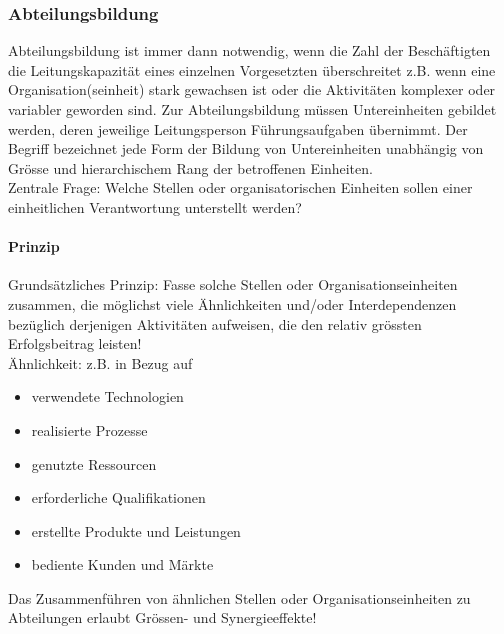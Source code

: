 \subsubsection{Abteilungsbildung}
Abteilungsbildung ist immer dann notwendig, wenn die Zahl der Beschäftigten die Leitungskapazität eines einzelnen Vorgesetzten überschreitet z.B. wenn eine Organisation(seinheit) stark gewachsen ist oder die Aktivitäten komplexer oder variabler geworden sind. Zur Abteilungsbildung müssen Untereinheiten gebildet werden, deren jeweilige Leitungsperson Führungsaufgaben übernimmt. Der Begriff bezeichnet jede Form der Bildung von Untereinheiten unabhängig von Grösse und hierarchischem Rang der betroffenen Einheiten. \\
Zentrale Frage: Welche Stellen oder organisatorischen Einheiten sollen einer einheitlichen Verantwortung unterstellt werden?

\paragraph{Prinzip}
Grundsätzliches Prinzip: Fasse solche Stellen oder Organisationseinheiten zusammen, die möglichst viele Ähnlichkeiten und/oder Interdependenzen bezüglich derjenigen Aktivitäten aufweisen, die den relativ grössten Erfolgsbeitrag leisten! \\
Ähnlichkeit: z.B. in Bezug auf
\begin{itemize}
	\item verwendete Technologien
	\item realisierte Prozesse
	\item genutzte Ressourcen
	\item erforderliche Qualifikationen
	\item erstellte Produkte und Leistungen
	\item bediente Kunden und Märkte
\end{itemize}
Das Zusammenführen von ähnlichen Stellen oder Organisationseinheiten zu Abteilungen erlaubt Grössen- und Synergieeffekte!

